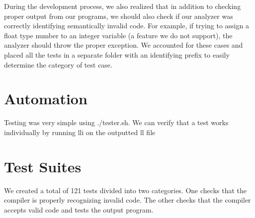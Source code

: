 \begin{homeworkProblem}
	During the development process, we also realized that in addition to checking proper output from our programs, we should also check if our analyzer was correctly identifying semantically invalid code. For example, if trying to assign a float type number to an integer variable (a feature we do not support), the analyzer should throw the proper exception. We accounted for these cases and placed all the tests in a separate folder with an identifying prefix to easily determine the category of test case.
	\section{Automation}
	Testing was very simple using ./tester.sh. We can verify that a test works individually by running lli on the outputted ll file
	\section{Test Suites}
	We created a total of 121 tests divided into two categories. One checks that the compiler is properly recognizing invalid code. The other checks that the compiler accepts valid code and tests the output program. 

\end{homeworkProblem}